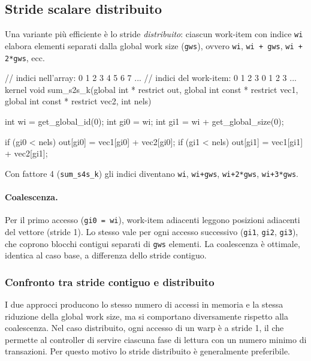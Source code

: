 \subsection{Stride scalare distribuito}

Una variante più efficiente è lo stride \emph{distribuito}: ciascun work-item con indice \texttt{wi} elabora elementi separati dalla global work size (\texttt{gws}), ovvero \texttt{wi}, \texttt{wi + gws}, \texttt{wi + 2*gws}, ecc.

\begin{code}[caption={Stride scalare distribuito, fattore 2}, label={code:sum_s2s_k}]
// indici nell'array:    0 1 2 3 4 5 6 7 ...
// indici del work-item: 0 1 2 3 0 1 2 3 ...
kernel void sum_s2s_k(global int * restrict out,
    global int const * restrict vec1,
    global int const * restrict vec2,
    int nels)
{
    int wi = get_global_id(0);
    int gi0 = wi;
    int gi1 = wi + get_global_size(0);

    if (gi0 < nels) out[gi0] = vec1[gi0] + vec2[gi0];
    if (gi1 < nels) out[gi1] = vec1[gi1] + vec2[gi1];
}
\end{code}

Con fattore 4 (\texttt{sum\_s4s\_k}) gli indici diventano \texttt{wi}, \texttt{wi+gws}, \texttt{wi+2*gws}, \texttt{wi+3*gws}.

\paragraph{Coalescenza.}
Per il primo accesso (\texttt{gi0 = wi}), work-item adiacenti leggono posizioni adiacenti del vettore (stride 1). Lo stesso vale per ogni accesso successivo (\texttt{gi1}, \texttt{gi2}, \texttt{gi3}), che coprono blocchi contigui separati di \texttt{gws} elementi. La coalescenza è ottimale, identica al caso base, a differenza dello stride contiguo.

\subsubsection*{Confronto tra stride contiguo e distribuito}
I due approcci producono lo stesso numero di accessi in memoria e la stessa riduzione della global work size, ma si comportano diversamente rispetto alla coalescenza. Nel caso distribuito, ogni accesso di un warp è a stride 1, il che permette al controller di servire ciascuna fase di lettura con un numero minimo di transazioni. Per questo motivo lo stride distribuito è generalmente preferibile.

